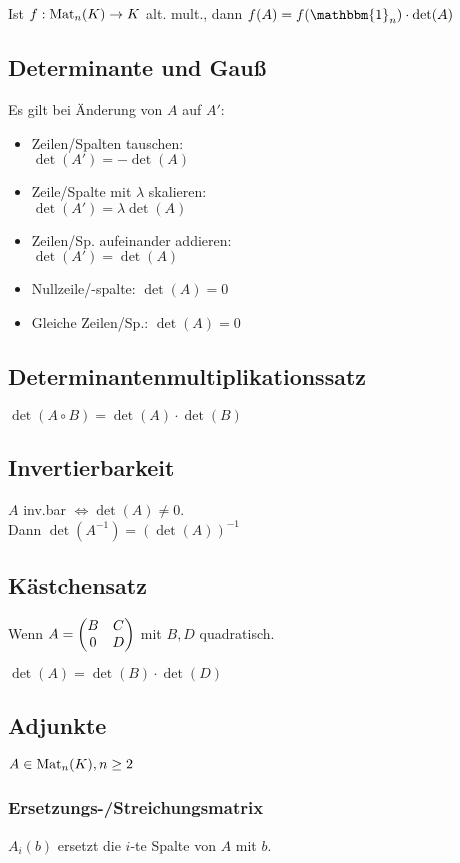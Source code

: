 Ist $f: \operatorname{Mat}_n(K)\to K$ alt. mult., dann
$f(A)=f(\mathbbm{1}_n) \cdot \det(A)$

\subsection*{Determinante und Gauß}
Es gilt bei Änderung von $A$ auf $A'$:
\begin{itemize}
	\item Zeilen/Spalten tauschen:\\ $\det(A')=-\det(A)$
	\item Zeile/Spalte mit $\lambda$ skalieren:\\ $\det(A')=\lambda\det(A)$
	\item Zeilen/Sp. aufeinander addieren:\\ $\det(A')=\det(A)$
	\item Nullzeile/-spalte: $\det(A)=0$
	\item Gleiche Zeilen/Sp.: $\det(A)=0$
\end{itemize}

\subsection*{Determinantenmultiplikationssatz}
$\det(A \circ B)=\det(A) \cdot \det(B)$

\subsection*{Invertierbarkeit}
$A$ inv.bar $\iff \det(A) \neq 0$. \\
Dann $\det(A^{-1}) = (\det(A))^{-1}$

\subsection*{Kästchensatz}
Wenn $A=\begin{pmatrix} B & C \\ 0 & D \end{pmatrix}$
mit $B,D$ quadratisch.

$\det(A)=\det(B)\cdot\det(D)$

\subsection*{Adjunkte}
$A \in \operatorname{Mat}_n(K), n \ge 2$

\subsubsection*{Ersetzungs-/Streichungsmatrix}
$A_i(b)$ ersetzt die $i$-te Spalte von $A$ mit $b$.

